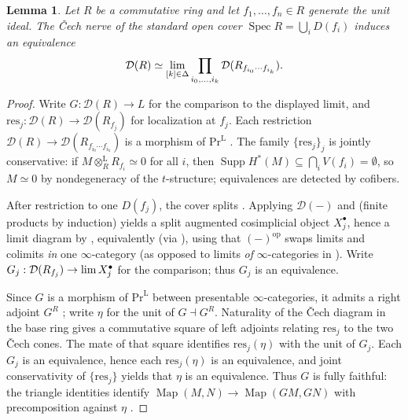 \documentclass[11pt]{amsart}
\newcommand{\cD}{\mathcal{D}}
\newcommand{\Map}{\operatorname{Map}}
\renewcommand{\lim}{\operatornamewithlimits{\rm{lim}}}
\newcommand{\Spec}{\operatorname{Spec}}
\renewcommand{\Pr}{\mathrm{Pr}}
\theoremstyle{plain}
\newtheorem{lemma}[lemma]{Lemma}
\theoremstyle{definition}
\numberwithin{equation}{section}
\begin{document}
\begin{lemma}\label{lem:affine-cech}
Let $R$ be a commutative ring and let $f_1,\dots,f_n\in R$ generate the unit ideal.
The \v Cech nerve of the standard open cover $\Spec R=\bigcup_i D(f_i)$ induces an equivalence
\[
 \cD(R)\simeq\lim_{[k]\in\Delta}\prod_{i_0,\dots,i_k}\cD(R_{f_{i_0}\cdots f_{i_k}}).
\]
\end{lemma}
\begin{proof}
Write $G:\cD(R)\to L$ for the comparison to the displayed limit, and $\mathrm{res}_j:\cD(R)\to\cD(R_{f_j})$ for localization at $f_j$.
Each restriction $\cD(R)\to\cD(R_{f_{i_0}\cdots f_{i_k}})$ is a morphism of $\Pr^{\mathrm L}$ \cite[Definition 5.5.3.1; Proposition 5.5.3.13]{HTT}.
The family $\{\mathrm{res}_j\}_j$ is jointly conservative: if $M\otimes_R^{\mathrm L}R_{f_i}\simeq0$ for all $i$, then $\operatorname{Supp}H^*(M)\subseteq\bigcap_i V(f_i)=\emptyset$, so $M\simeq0$ by nondegeneracy of the $t$-structure; equivalences are detected by cofibers.

After restriction to one $D(f_j)$, the cover splits \cite[Definition 4.7.2.2]{HA}.
Applying $\cD(-)$ and  (finite products by induction) yields a split augmented cosimplicial object $X_j^\bullet$, hence a limit diagram by \cite[\href{https://kerodon.net/tag/04SH}{Tag 04SH}]{Kerodon}, equivalently \cite[Remark 4.7.2.3]{HA} (via \cite[Lemma 6.1.3.16]{HTT}), using that $(-)^{\mathrm{op}}$ swaps limits and colimits \emph{in} one $\infty$-category (as opposed to limits \emph{of} $\infty$-categories in ).
Write $G_j:\cD(R_{f_j})\to\lim X_j^\bullet$ for the comparison; thus $G_j$ is an equivalence.

Since $G$ is a morphism of $\Pr^{\mathrm L}$ between presentable $\infty$-categories, it admits a right adjoint $G^R$ \cite[Corollary 5.5.2.9; Proposition 5.5.3.13]{HTT}; write $\eta$ for the unit of $G\dashv G^R$.
Naturality of the \v Cech diagram in the base ring gives a commutative square of left adjoints relating $\mathrm{res}_j$ to the two \v Cech cones.
The mate of that square identifies $\mathrm{res}_j(\eta)$ with the unit of $G_j$.
Each $G_j$ is an equivalence, hence each $\mathrm{res}_j(\eta)$ is an equivalence, and joint conservativity of $\{\mathrm{res}_j\}$ yields that $\eta$ is an equivalence.
Thus $G$ is fully faithful: the triangle identities identify $\Map(M,N)\to\Map(GM,GN)$ with precomposition against $\eta$ \cite[Definition 1.2.10.1]{HTT}.


\end{proof}
\end{document}
